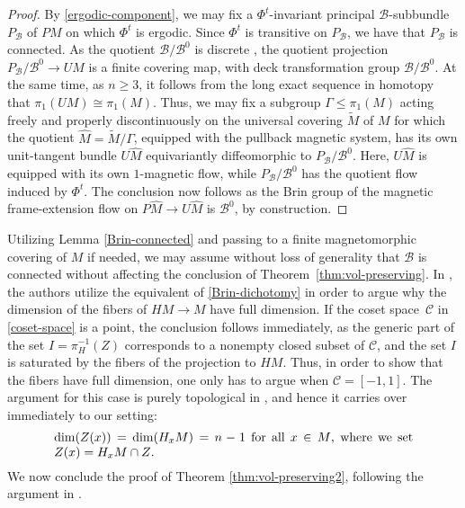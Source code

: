 \documentclass[pdftex]{sigma}
\numberwithin{equation}{section}
\theoremstyle{definition}
\begin{document}
\begin{proof}
 By \eqref{ergodic-component}, we may fix a $\Phi^t$-invariant principal $\mathcal{B}$-subbundle $P_{\mathcal{B}}$ of $PM$ on which $\Phi^t$ is ergodic. Since $\Phi^t$ is transitive on $P_{\mathcal{B}}$, we have that $P_{\mathcal{B}}$ is connected. As the quotient $\mathcal{B}/\mathcal{B}^0$ is discrete \cite[Proposition 6.15]{MR4242835}, the quotient projection $P_{\mathcal{B}} / \mathcal{B}^0 \to UM$ is a finite covering map, with deck transformation group $\mathcal{B}/\mathcal{B}^0$. At the same time, as $n\geq 3$, it follows from the long exact sequence in homotopy that $\pi_1(UM)\cong \pi_1(M)$. Thus, we may fix a subgroup $\Gamma \leq \pi_1(M)$ acting freely and properly discontinuously on the universal covering $\widetilde{M}$ of $M$ for which the quotient $\hat{M} = \widetilde{M}/\Gamma$, equipped with the pullback magnetic system, has its own unit-tangent bundle $U\hat{M}$ equivariantly diffeomorphic to $P_{\mathcal{B}}/\mathcal{B}^0$. Here, $U\hat{M}$ is equipped with its own $1$-magnetic flow, while $P_{\mathcal{B}}/\mathcal{B}^0$ has the quotient flow induced by $\Phi^t$. The conclusion now follows as the Brin group of the magnetic frame-extension flow on $P\hat{M}\to U\hat{M}$ is $\mathcal{B}^0$, by construction.
 \end{proof}

 Utilizing Lemma \ref{Brin-connected} and passing to a finite magnetomorphic covering of $M$ if needed, we may assume without loss of generality that $\mathcal{B}$ is connected without affecting the conclusion of Theorem~\ref{thm:vol-preserving}. In \cite[Proposition 3.3.6]{filip2024finiteness}, the authors utilize the equivalent of \eqref{Brin-dichotomy} in order to argue why the dimension of the fibers of $HM \rightarrow M$ have full dimension. If the coset space~$\mathcal{C}$ in \eqref{coset-space} is a point, the conclusion follows immediately, as the generic part of the set ${I = \pi_H^{-1}(Z)}$ corresponds to a nonempty closed subset of $\mathcal{C}$, and the set $I$ is saturated by the fibers of the projection to $HM$. Thus, in order to show that the fibers have full dimension, one only has to argue when $\mathcal{C} = [-1,1]$. The argument for this case is purely topological in \cite[Proposition~3.3.6]{filip2024finiteness}, and hence it carries over immediately to our setting:
\begin{equation}\label{full-dim}
 \parbox{.83\textwidth}{$\dim(Z(x)) = \dim (H_xM) = n-1$ for all $x\in M$, where we set $Z(x) = H_xM\cap Z$.}\end{equation}
We now conclude the proof of Theorem \ref{thm:vol-preserving2}, following the argument in \cite[Section 3.3.7]{filip2024finiteness}.
\end{document}
